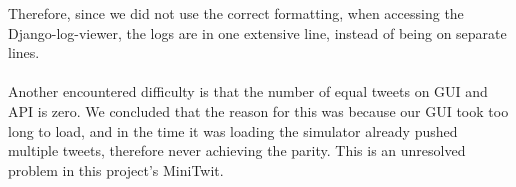 Therefore, since we did not use the correct formatting, when accessing the Django-log-viewer, the logs are in one extensive line, instead of being on separate lines.
\\\\
Another encountered difficulty is that the number of equal tweets on GUI and API is zero. We concluded that the reason for this was because our GUI took too long to load, and in the time it was loading the simulator already pushed multiple tweets, therefore never achieving the parity. This is an unresolved problem in this project's MiniTwit.